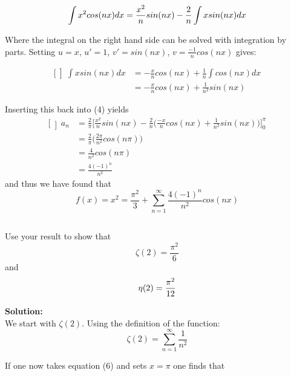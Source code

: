 \documentclass[a4paper,12pt]{article}
\begin{document}
\begin{equation*}
\int x^2cos(nx)dx = \frac{x^2}{n}sin(nx)  - \frac{2}{n}\int xsin(nx)dx\\
\end{equation*}

Where the integral on the right hand side can be solved with integration by parts. Setting $u=x$, $u' = 1$, $v' = sin(nx)$, $v = \frac{-1}{n}cos(nx)$ gives:

\begin{equation*}
\begin{aligned}[\left]
\int xsin(nx)dx &= -\frac{x}{n}cos(nx) +\frac{1}{n}\int cos(nx)dx\\
&=-\frac{x}{n}cos(nx) + \frac{1}{n^2}sin(nx)
\end{aligned}
\end{equation*}

Inserting this back into (4) yields
\begin{equation*}
\begin{aligned}[\left]
a_n &= \frac{2}{\pi}\bigg[\frac{x^2}{n}sin(nx) - \frac{2}{n}\bigg(\frac{-x}{n}cos(nx)+\frac{1}{n^2}sin(nx)\bigg) \bigg]_{0}^{\pi}\\
    &= \frac{2}{\pi}\bigg(\frac{2\pi}{n^2}cos(n\pi)\bigg)\\
    &= \frac{4}{n^2}cos(n\pi)\\
    &= \frac{4(-1)^n}{n^2}
\end{aligned}
\end{equation*}
and thus we have found that
\begin{equation}
f(x) = x^2 = \frac{\pi^2}{3} + \sum_{n=1}^{\infty}\frac{4(-1)^n}{n^2}cos(nx)
\end{equation}

\subsection{}
Use your result to show that 
\begin{equation}
\zeta(2) = \frac{\pi^2}{6}
\end{equation}
and
\begin{equation}
\eta(2) = \frac{\pi^2}{12}\\
\end{equation}

\textbf{Solution:}\\
We start with $\zeta(2)$. Using the definition of the function:
$$\zeta(2) = \sum_{n=1}^{\infty}\frac{1}{n^2}$$

If one now takes equation (6) and sets $x = \pi$ one finds that
\end{document}
